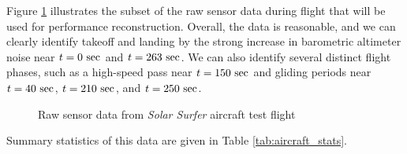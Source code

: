 \documentclass[conf]{new-aiaa}
\begin{document}
    Figure \ref{fig:raw_flight_data} illustrates the subset of the raw sensor data during flight that will be used for performance reconstruction. Overall, the data is reasonable, and we can clearly identify takeoff and landing by the strong increase in barometric altimeter noise near $t=0\ \rm sec$ and $t=263\ \rm sec$. We can also identify several distinct flight phases, such as a high-speed pass near $t=150\ \rm sec$ and gliding periods near $t=40\ \rm sec$, $t=210\ \rm sec$, and $t=250\ \rm sec$.

    \begin{figure}[H]
        \centering
        \caption{Raw sensor data from \emph{Solar Surfer} aircraft test flight}
        \label{fig:raw_flight_data}
    \end{figure}

    Summary statistics of this data are given in Table \ref{tab:aircraft_stats}.
\end{document}
